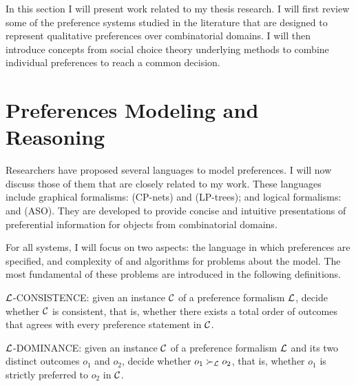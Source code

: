 
In this section I will present work related to my thesis research.
I will first review some of the preference
systems studied in the literature that are designed to represent
qualitative preferences over combinatorial domains. 
I will then introduce concepts
from social choice theory underlying methods to
combine individual preferences to reach a common decision.

\section{Preferences Modeling and Reasoning \label{sec:pref_reasoning}}
Researchers have proposed several languages to model preferences.
I will now discuss those of them that are closely related
to my work.
These languages include graphical formalisms:
 (CP-nets) and
 (LP-trees);
and logical formalisms:
 and
 (ASO).
They are developed to provide concise and intuitive
presentations of preferential information for objects from
combinatorial domains.

For all systems, I will focus on two aspects:
the language in which preferences are specified,
and complexity of and algorithms for
problems about the model.
The most fundamental of these problems are introduced
in the following definitions.

\begin{definition}
\label{def:con}
  $\mathcal{L}$-CONSISTENCE: given an instance $\mathcal{C}$ of a preference
	formalism $\mathcal{L}$, decide whether $\mathcal{C}$ is consistent, that is,
  whether there exists a total order of outcomes that agrees with every
	preference statement in $\mathcal{C}$.
\end{definition}

\begin{definition}
\label{def:dom}
  $\mathcal{L}$-DOMINANCE: given an instance $\mathcal{C}$ of a preference
	formalism $\mathcal{L}$ and its two distinct outcomes
  $o_1$ and $o_2$, decide whether $o_1 \succ_{\mathcal{L}} o_2$, that is,
  whether $o_1$ is strictly preferred to $o_2$ in $\mathcal{C}$.
\end{definition}

